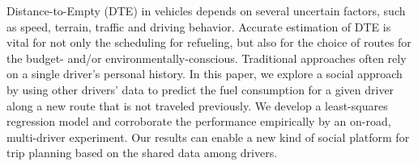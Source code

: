 Distance-to-Empty (DTE) in vehicles depends on several uncertain factors, such as speed, terrain, traffic and driving behavior. Accurate estimation of DTE is vital for not only the scheduling for refueling, but also for the choice of routes for the budget- and/or environmentally-conscious. Traditional approaches often rely on a single driver's personal history. In this paper, we explore a social approach by using other drivers' data to predict the fuel consumption for a given driver along a new route that is not traveled previously. We develop a least-squares regression model and corroborate the performance empirically by an on-road, multi-driver experiment. Our results can enable a new kind of social platform for trip planning based on the shared data among drivers.